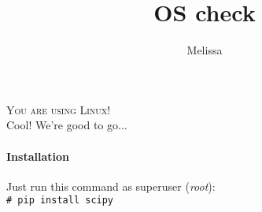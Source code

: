 \documentclass{article}
\title{ OS check }
\author{ Melissa }
\date{  }
\begin{document}
\maketitle
{\centering \textsc{You are using Linux!}}\\ Cool! We're good to go...\\ \paragraph*{Installation} Just run this command as superuser (\emph{root}):\\ \centering \verb+# pip install scipy+
\end{document}
